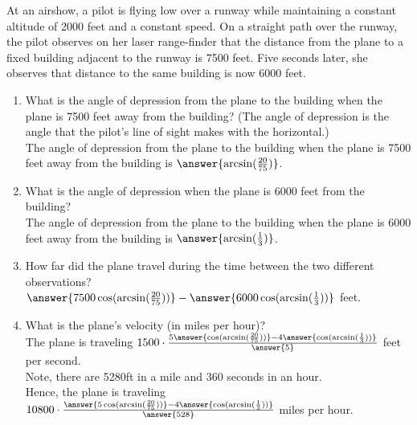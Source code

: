 \documentclass{ximera}
\author{Elizabeth Campolongo}
\begin{document}
\begin{exercise}
At an airshow, a pilot is flying low over a runway while maintaining a constant altitude of 2000 feet and a constant speed.  On a straight path over the runway, the pilot observes on her laser range-finder that the distance from the plane to a fixed building adjacent to the runway is 7500 feet.  Five seconds later, she observes that distance to the same building is now 6000 feet.%
\par
%
\begin{enumerate}
\item What is the angle of depression from the plane to the building when the plane is 7500 feet away from the building? (The angle of depression is the angle that the pilot's line of sight makes with the horizontal.) \\
%
The angle of depression from the plane to the building when the plane is 7500 feet away from the building is $\answer{\arcsin(\frac{20}{75})}$.
%
\item What is the angle of depression when the plane is 6000 feet from the building?\\
%
The angle of depression from the plane to the building when the plane is 6000 feet away from the building is $\answer{\arcsin(\frac{1}{3})}$.
%
\item How far did the plane travel during the time between the two different observations?\\
$\answer{7500\cos(\arcsin(\frac{20}{75}))} - \answer{6000\cos(\arcsin(\frac{1}{3}))}$ feet.
%
\item What is the plane's velocity (in miles per hour)? \\
The plane is traveling $1500\cdot\frac{5\answer{\cos(\arcsin(\frac{20}{75}))} - 4\answer{\cos(\arcsin(\frac{1}{3}))}}{\answer{5}}$ feet per second. \\
Note, there are 5280ft in a mile and 360 seconds in an hour. \\
Hence, the plane is traveling $10800\cdot\frac{\answer{5\cos(\arcsin(\frac{20}{75}))} - 4\answer{\cos(\arcsin(\frac{1}{3}))}}{\answer{528}}$ miles per hour.
%
\end{enumerate}
\end{exercise}
\end{document}
